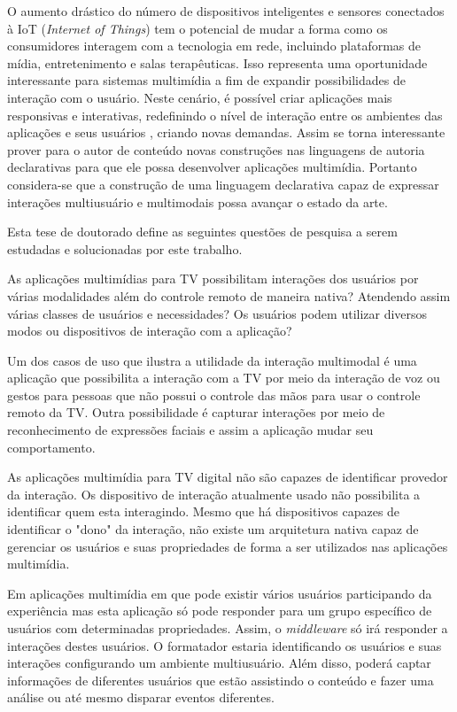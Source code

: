 O aumento drástico do número de dispositivos inteligentes e sensores conectados à IoT (\emph{Internet of Things}) tem o potencial de mudar a forma como os consumidores interagem com a tecnologia em rede, incluindo plataformas de mídia, entretenimento e salas terapêuticas. Isso representa uma oportunidade interessante para sistemas multimídia a fim de expandir possibilidades de interação com o usuário. Neste cenário, é possível criar aplicações mais responsivas e interativas, redefinindo o nível de interação entre os ambientes das aplicações e seus usuários \cite{jalal2017iot}, criando novas demandas. Assim se torna interessante prover para o autor de conteúdo novas construções nas linguagens de autoria declarativas para que ele possa desenvolver aplicações multimídia. Portanto considera-se que a construção de uma linguagem declarativa capaz de expressar interações multiusuário e multimodais possa avançar o estado da arte.

Esta tese de doutorado define as seguintes questões de pesquisa a serem estudadas e solucionadas por este trabalho.

\begin{prob}
\label{prob:pMultimodal}
    As aplicações multimídias para TV possibilitam interações dos usuários por várias modalidades além do controle remoto de maneira nativa? Atendendo assim várias classes de usuários  e necessidades?
    Os usuários podem utilizar diversos modos ou dispositivos de interação com a aplicação?
\end{prob}

Um dos casos de uso que ilustra a utilidade da interação multimodal é uma aplicação que possibilita a interação com a TV por meio da interação de voz ou gestos para pessoas que não possui o controle das mãos para usar o controle remoto da TV. Outra possibilidade é capturar interações por meio de reconhecimento de expressões faciais e assim a aplicação mudar seu comportamento.

 \begin{prob}
\label{prob:pMultiUsuario}
    As aplicações multimídia para TV digital não são capazes de identificar provedor da interação. Os dispositivo de interação atualmente usado não possibilita a identificar quem esta interagindo. Mesmo que há dispositivos capazes de identificar o "dono" da interação, não existe um arquitetura nativa capaz de gerenciar os usuários e suas propriedades de forma a ser utilizados nas aplicações multimídia.
\end{prob}

Em aplicações multimídia em que pode existir vários usuários participando da experiência mas esta aplicação só pode responder para um grupo específico de usuários com determinadas propriedades. Assim, o \textit{middleware} só irá responder a interações destes usuários. O formatador estaria identificando os usuários e suas interações configurando um ambiente multiusuário. Além disso, poderá captar informações de diferentes usuários que estão assistindo o conteúdo e fazer uma análise ou até mesmo disparar eventos diferentes. 

